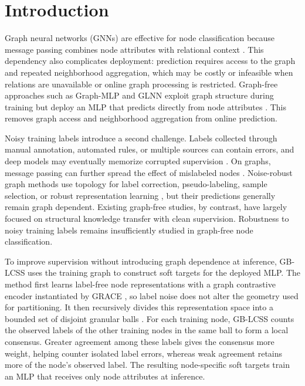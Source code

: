 \documentclass[preprint,12pt]{elsarticle}
\begin{document}
\FloatBarrier

\section{Introduction}\label{sec:1}

Graph neural networks (GNNs) are effective for node classification because message passing combines node attributes with relational context \cite{ref1,ref2}. This dependency also complicates deployment: prediction requires access to the graph and repeated neighborhood aggregation, which may be costly or infeasible when relations are unavailable or online graph processing is restricted. Graph-free approaches such as Graph-MLP and GLNN exploit graph structure during training but deploy an MLP that predicts directly from node attributes \cite{ref3,ref4}. This removes graph access and neighborhood aggregation from online prediction.

Noisy training labels introduce a second challenge. Labels collected through manual annotation, automated rules, or multiple sources can contain errors, and deep models may eventually memorize corrupted supervision \cite{ref8}. On graphs, message passing can further spread the effect of mislabeled nodes \cite{ref13}. Noise-robust graph methods use topology for label correction, pseudo-labeling, sample selection, or robust representation learning \cite{ref9,ref10,ref11,ref12,ref47}, but their predictions generally remain graph dependent. Existing graph-free studies, by contrast, have largely focused on structural knowledge transfer with clean supervision. Robustness to noisy training labels remains insufficiently studied in graph-free node classification.

To improve supervision without introducing graph dependence at inference, GB-LCSS uses the training graph to construct soft targets for the deployed MLP. The method first learns label-free node representations with a graph contrastive encoder instantiated by GRACE \cite{ref16}, so label noise does not alter the geometry used for partitioning. It then recursively divides this representation space into a bounded set of disjoint granular balls \cite{ref34}. For each training node, GB-LCSS counts the observed labels of the other training nodes in the same ball to form a local consensus. Greater agreement among these labels gives the consensus more weight, helping counter isolated label errors, whereas weak agreement retains more of the node's observed label. The resulting node-specific soft targets train an MLP that receives only node attributes at inference.
\end{document}
